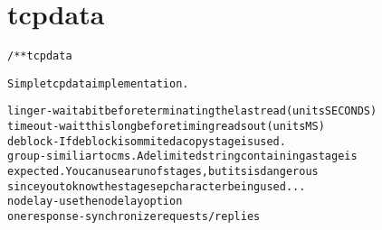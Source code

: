 \section{tcpdata}
\begin{shaded}
\begin{alltt}
/** tcpdata

Simple tcpdata implementation.

linger      - wait a bit before terminating the last read (units SECONDS)
timeout     - wait this long before timing reads out (units MS)
deblock     - If deblock is ommited a copy stage is used.
group       - similiar to cms.  A delimited string containing a stage is
              expected.  You can use a run of stages, but its is dangerous
              since you to know the stage sep character being used...
nodelay     - use the nodelay option
oneresponse - synchronize requests/replies

\end{alltt}
\end{shaded}
